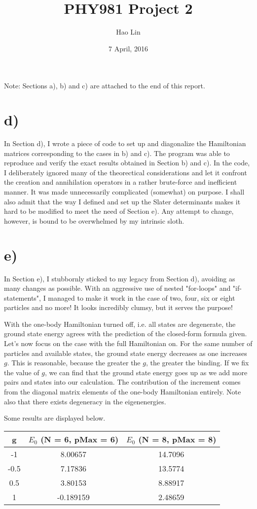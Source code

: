 \documentclass[11pt, oneside]{article}   	%
\title{PHY981 Project 2}
\author{Hao Lin}
\date{7 April, 2016}							%
\begin{document}
\maketitle

Note: Sections a), b) and c) are attached to the end of this report.

\section{d)}
In Section d), I wrote a piece of code to set up and diagonalize the Hamiltonian matrices corresponding to the cases in b) and c). The program was able to reproduce and verify the exact results obtained in Section b) and c). In the code, I deliberately ignored many of the theorectical considerations and let it confront the creation and annihilation operators in a rather brute-force and inefficient manner. It was made unnecessarily complicated (somewhat) on purpose. I shall also admit that the way I defined and set up the Slater determinants makes it hard to be modified to meet the need of Section e). Any attempt to change, however, is bound to be overwhelmed by my intrinsic sloth.

\section{e)}
In Section e), I stubbornly sticked to my legacy from Section d), avoiding as many changes as possible. With an aggressive use of nested "for-loops" and "if-statements", I managed to make it work in the case of two, four, six or eight particles and no more! It looks incredibly clumsy, but it serves the purpose!

With the one-body Hamiltonian turned off, i.e. all states are degenerate, the ground state energy agrees with the prediction of the closed-form formula given. Let's now focus on the case with the full Hamiltonian on. For the same number of particles and available states, the ground state energy decreases as one increases $g$. This is reasonable, because the greater the $g$, the greater the binding. If we fix the value of $g$, we can find that the ground state energy goes up as we add more pairs and states into our calculation. The contribution of the increment comes from the diagonal matrix elements of the one-body Hamiltonian entirely. Note also that there exists degeneracy in the eigenenergies.

Some results are displayed below.
\begin{table}[H]
  \centering
\begin{tabular}{ccc}
  \toprule
	g & $E_0$ (N = 6, pMax = 6) & $E_0$ (N = 8, pMax = 8)\\
  \midrule
	-1 & 8.00657 & 14.7096 \\
	-0.5 & 7.17836 & 13.5774 \\
	0.5 & 3.80153 & 8.88917 \\
	1 & -0.189159 & 2.48659 \\
	\bottomrule
  \end{tabular}
\end{table}
\end{document}
